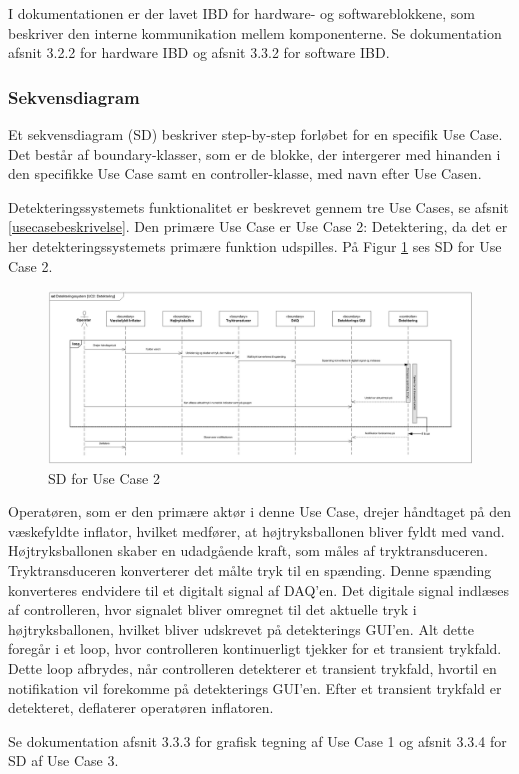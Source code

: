 I dokumentationen er der lavet IBD for hardware- og softwareblokkene, som beskriver den interne kommunikation mellem komponenterne. Se dokumentation afsnit 3.2.2 for hardware IBD og afsnit 3.3.2 for software IBD.  

\subsubsection{Sekvensdiagram}
Et sekvensdiagram (SD) beskriver step-by-step forløbet for en specifik Use Case. Det består af boundary-klasser, som er de blokke, der intergerer med hinanden i den specifikke Use Case samt en controller-klasse, med navn efter Use Casen.

Detekteringssystemets funktionalitet er beskrevet gennem tre Use Cases, se afsnit \ref{usecasebeskrivelse}. Den primære Use Case er Use Case 2: Detektering, da det er her detekteringssystemets primære funktion udspilles. På Figur \ref{UC2SD} ses SD for Use Case 2.   

\begin{figure}[H]
	\centering
	\includegraphics[width=1\textwidth]{Figure/UC2SD}
	\caption{SD for Use Case 2}
	\label{UC2SD}
\end{figure}  

Operatøren, som er den primære aktør i denne Use Case, drejer håndtaget på den væskefyldte inflator, hvilket medfører, at højtryksballonen bliver fyldt med vand. Højtryksballonen skaber en udadgående kraft, som måles af tryktransduceren. Tryktransduceren konverterer det målte tryk til en spænding. Denne spænding konverteres endvidere til et digitalt signal af DAQ’en. Det digitale signal indlæses af controlleren, hvor signalet bliver omregnet til det aktuelle tryk i højtryksballonen, hvilket bliver udskrevet på detekterings GUI’en. Alt dette foregår i et loop, hvor controlleren kontinuerligt tjekker for et transient trykfald. Dette loop afbrydes, når controlleren detekterer et transient trykfald, hvortil en notifikation vil forekomme på detekterings GUI’en. Efter et transient trykfald er detekteret, deflaterer operatøren inflatoren.

Se dokumentation afsnit 3.3.3 for grafisk tegning af Use Case 1 og afsnit 3.3.4 for SD af Use Case 3.  














